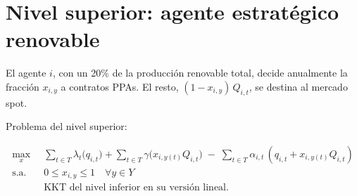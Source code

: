 \documentclass[a4paper,11pt]{article}
\begin{document}
\section{Nivel superior: agente estratégico renovable}

El agente $i$, con un 20\% de la producción renovable total, decide anualmente la fracción $x_{i,y}$ a contratos PPAs. El resto, $(1-x_{i,y})\,Q_{i,t}$, se destina al mercado spot.

Problema del nivel superior:

\begin{align}
\max_{x}\;\;
& \sum_{t \in T} \lambda_t \Big( q_{i,t}\Big)
+ \sum_{t \in T} \gamma \Big(x_{i,y(t)} Q_{i,t} \Big)
\;-\; \sum_{t \in T} \alpha_{i,t}\, (q_{i,t} + x_{i,y(t)} Q_{i,t})
\label{UP_obj}\\[2mm]
\text{s.a.}\;\;
& 0 \le x_{i,y} \le 1 \quad \forall y \in Y
\label{UP_bounds}\\
& \text{KKT del nivel inferior en su versión lineal.}
\label{UP_MPEC}
\end{align}



\end{document}
